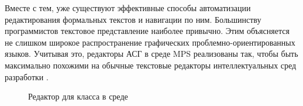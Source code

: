 Вместе с тем, уже существуют эффективные способы автоматизации редактирования формальных текстов и навигации по ним.
Большинству программистов текстовое представление наиболее привычно. Этим объясняется не слишком широкое распространение
графических проблемно-ориентированных языков. Учитывая это, редакторы АСГ в среде MPS реализованы так, чтобы быть
максимально похожими на обычные текстовые редакторы интеллектуальных сред разработки \pic{\ref{fig:ClassInMPS}}.

\begin{figure}
\centering
{}
\caption{Редактор для класса в среде \MPS{}}
\label{fig:ClassInMPS}
\end{figure}
